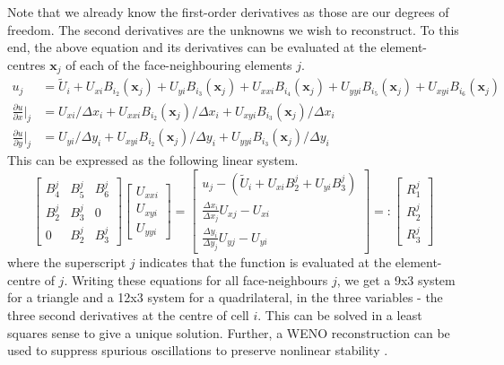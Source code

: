 \documentclass[11pt]{article}
\let\bld\boldsymbol
\begin{document}
Note that we already know the first-order derivatives as those are our degrees of freedom. The second derivatives are the unknowns we wish to reconstruct. To this end, the above equation and its derivatives can be evaluated at the element-centres $\bld{x}_j$ of each of the face-neighbouring elements $j$.
\begin{align}
u_j &= \tilde{U}_i + U_{xi}B_{i_2}(\bld{x}_j) + U_{yi}B_{i_3}(\bld{x}_j) + U_{xxi} B_{i_4}(\bld{x}_j) + U_{yyi} B_{i_5}(\bld{x}_j) + U_{xyi} B_{i_6}(\bld{x}_j) \\
\frac{\partial u}{\partial x}\Big|_j &= U_{xi}/\Delta x_i + U_{xxi} B_{i_2}(\bld{x}_j) / \Delta x_i + U_{xyi} B_{i_3}(\bld{x}_j) /\Delta x_i \\
\frac{\partial u}{\partial y}\Big|_j &= U_{yi}/\Delta y_i + U_{xyi} B_{i_2}(\bld{x}_j) / \Delta y_i + U_{yyi}B_{i_3}(\bld{x}_j)/\Delta y_i
\end{align}
This can be expressed as the following linear system.
\begin{equation}
\begin{bmatrix}
B_4^j & B_5^j & B_6^j \\
B_2^j & B_3^j & 0 \\
0 & B_2^j & B_3^j
\end{bmatrix}
\begin{bmatrix}
U_{xxi} \\ U_{xyi} \\ U_{yyi}
\end{bmatrix} =
\begin{bmatrix}
u_j - (\tilde{U}_i + U_{xi}B_2^j + U_{yi}B_3^j) \\
\frac{\Delta x_i}{\Delta x_j}U_{xj} - U_{xi} \\
\frac{\Delta y_i}{\Delta y_j}U_{yj} - U_{yi}
\end{bmatrix} =:
\begin{bmatrix}
R_1^j \\ R_2^j \\ R_3^j
\end{bmatrix}
\end{equation}
where the superscript $j$ indicates that the function is evaluated at the element-centre of $j$. Writing these equations for all face-neighbours $j$, we get a 9x3 system for a triangle and a 12x3 system for a quadrilateral, in the three variables - the three second derivatives at the centre of cell $i$. This can be solved in a least squares sense to give a unique solution. Further, a WENO reconstruction can be used to suppress spurious oscillations to preserve nonlinear stability \cite{luo_hweno}.
\end{document}
